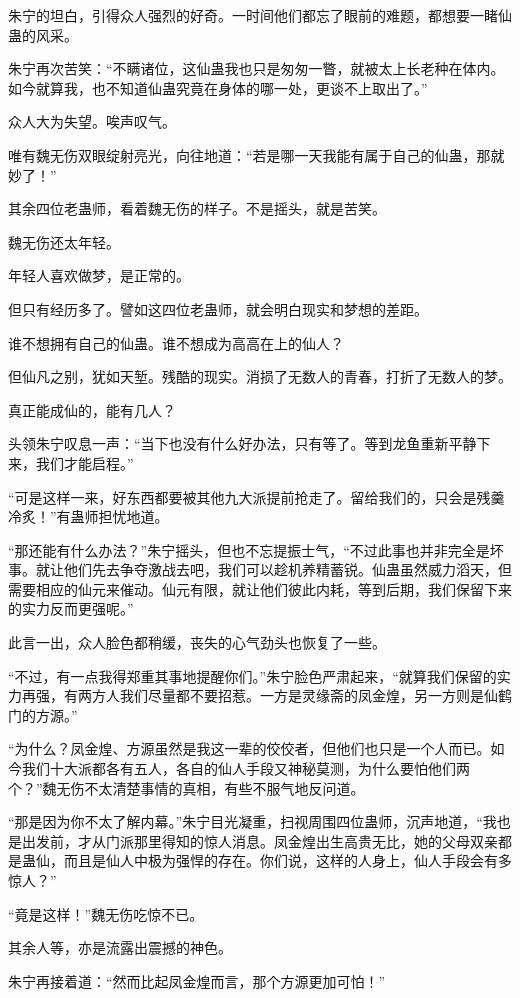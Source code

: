 \begin{this_body}
朱宁的坦白，引得众人强烈的好奇。一时间他们都忘了眼前的难题，都想要一睹仙蛊的风采。

朱宁再次苦笑：“不瞒诸位，这仙蛊我也只是匆匆一瞥，就被太上长老种在体内。如今就算我，也不知道仙蛊究竟在身体的哪一处，更谈不上取出了。”

众人大为失望。唉声叹气。

唯有魏无伤双眼绽射亮光，向往地道：“若是哪一天我能有属于自己的仙蛊，那就妙了！”

其余四位老蛊师，看着魏无伤的样子。不是摇头，就是苦笑。

魏无伤还太年轻。

年轻人喜欢做梦，是正常的。

但只有经历多了。譬如这四位老蛊师，就会明白现实和梦想的差距。

谁不想拥有自己的仙蛊。谁不想成为高高在上的仙人？

但仙凡之别，犹如天堑。残酷的现实。消损了无数人的青春，打折了无数人的梦。

真正能成仙的，能有几人？

头领朱宁叹息一声：“当下也没有什么好办法，只有等了。等到龙鱼重新平静下来，我们才能启程。”

“可是这样一来，好东西都要被其他九大派提前抢走了。留给我们的，只会是残羹冷炙！”有蛊师担忧地道。

“那还能有什么办法？”朱宁摇头，但也不忘提振士气，“不过此事也并非完全是坏事。就让他们先去争夺激战去吧，我们可以趁机养精蓄锐。仙蛊虽然威力滔天，但需要相应的仙元来催动。仙元有限，就让他们彼此内耗，等到后期，我们保留下来的实力反而更强呢。”

此言一出，众人脸色都稍缓，丧失的心气劲头也恢复了一些。

“不过，有一点我得郑重其事地提醒你们。”朱宁脸色严肃起来，“就算我们保留的实力再强，有两方人我们尽量都不要招惹。一方是灵缘斋的凤金煌，另一方则是仙鹤门的方源。”

“为什么？凤金煌、方源虽然是我这一辈的佼佼者，但他们也只是一个人而已。如今我们十大派都各有五人，各自的仙人手段又神秘莫测，为什么要怕他们两个？”魏无伤不太清楚事情的真相，有些不服气地反问道。

“那是因为你不太了解内幕。”朱宁目光凝重，扫视周围四位蛊师，沉声地道，“我也是出发前，才从门派那里得知的惊人消息。凤金煌出生高贵无比，她的父母双亲都是蛊仙，而且是仙人中极为强悍的存在。你们说，这样的人身上，仙人手段会有多惊人？”

“竟是这样！”魏无伤吃惊不已。

其余人等，亦是流露出震撼的神色。

朱宁再接着道：“然而比起凤金煌而言，那个方源更加可怕！”


\end{this_body}
